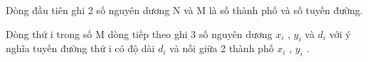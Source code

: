 Dòng đầu tiên ghi 2 số nguyên dương N và M là số thành phố và số tuyến đường.  

   Dòng thứ i trong số M dòng tiếp theo ghi 3 số nguyên dương $x_{i}$   , $y_{i}$   và $d_{i}$   với ý nghĩa tuyến đường thứ i có độ dài $d_{i}$   và nối giữa 2 thành phố $x_{i}$   , $y_{i}$   .